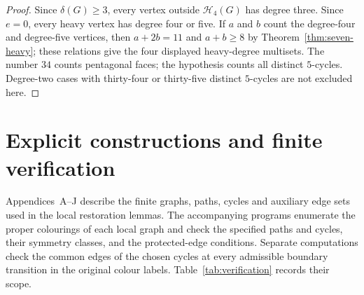 \documentclass[11pt]{article}
\theoremstyle{remark}
\numberwithin{equation}{section}
\numberwithin{table}{section}
\begin{document}
\begin{proof}
Since $\delta(G)\ge3$, every vertex outside $\mathcal H_4(G)$ has
degree three.  Since $e=0$, every heavy vertex has degree four or five.
If $a$ and $b$ count the degree-four and degree-five vertices, then
$a+2b=11$ and $a+b\ge8$ by Theorem~\ref{thm:seven-heavy}; these
relations give the four displayed heavy-degree multisets.  The number
$34$ counts pentagonal faces; the hypothesis counts all distinct
$5$-cycles. Degree-two cases with thirty-four or thirty-five distinct
$5$-cycles are not excluded here.
\end{proof}

\section{Explicit constructions and finite verification}
\label{sec:verification}

Appendices~A--J describe the finite graphs, paths, cycles and auxiliary
edge sets used in the local restoration lemmas. The accompanying
programs enumerate the proper colourings of each local graph and check
the specified paths and cycles, their symmetry classes, and the
protected-edge conditions. Separate computations check the common edges
of the chosen cycles at every admissible boundary transition in the
original colour labels. Table~\ref{tab:verification} records their scope.
\end{document}
